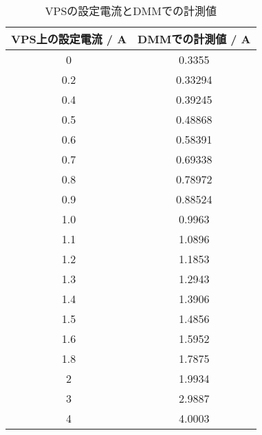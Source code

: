 
\begin{table}[!htp]\centering
	\caption{VPSの設定電流とDMMでの計測値}\label{tab:exp2}
	\scriptsize
	\begin{tabular}{cc}\toprule
		VPS上の設定電流 / \si{A} & DMMでの計測値 / \si{A} \\\midrule
		0                  & 0.3355            \\
		0.2                & 0.33294           \\
		0.4                & 0.39245           \\
		0.5                & 0.48868           \\
		0.6                & 0.58391           \\
		0.7                & 0.69338           \\
		0.8                & 0.78972           \\
		0.9                & 0.88524           \\
		1.0                & 0.9963            \\
		1.1                & 1.0896            \\
		1.2                & 1.1853            \\
		1.3                & 1.2943            \\
		1.4                & 1.3906            \\
		1.5                & 1.4856            \\
		1.6                & 1.5952            \\
		1.8                & 1.7875            \\
		2                  & 1.9934            \\
		3                  & 2.9887            \\
		4                  & 4.0003            \\

\end{tabular}
\end{table}
